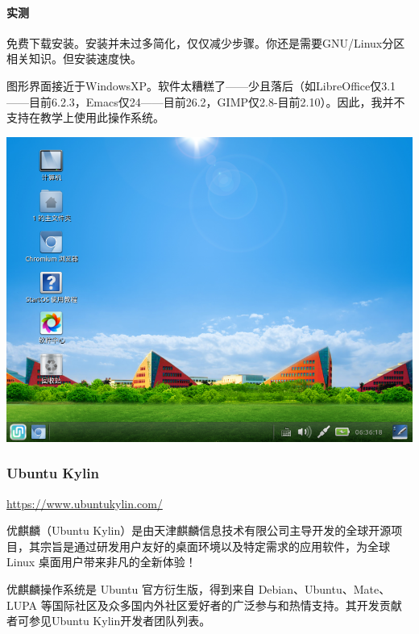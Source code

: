 \paragraph{实测}
免费下载安装。安装并未过多简化，仅仅减少步骤。你还是需要GNU/Linux分区相关知识。但安装速度快。\par
图形界面接近于WindowsXP。软件太糟糕了——少且落后（如LibreOffice仅3.1——目前6.2.3，Emacs仅24——目前26.2，GIMP仅2.8-目前2.10）。因此，我并不支持在教学上使用此操作系统。
\begin{center}
	\includegraphics[scale=0.5]{pic/startos}
\end{center} \par
\subsubsection{Ubuntu Kylin}
\url{https://www.ubuntukylin.com/}\par
优麒麟（Ubuntu Kylin）是由天津麒麟信息技术有限公司主导开发的全球开源项目，其宗旨是通过研发用户友好的桌面环境以及特定需求的应用软件，为全球 Linux 桌面用户带来非凡的全新体验！\par
优麒麟操作系统是 Ubuntu 官方衍生版，得到来自 Debian、Ubuntu、Mate、LUPA 等国际社区及众多国内外社区爱好者的广泛参与和热情支持。其开发贡献者可参见Ubuntu Kylin开发者团队列表。\cite{ukinfo}
